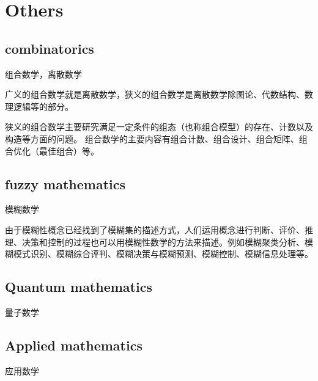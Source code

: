 

\chapter{Others}



\section{combinatorics}
组合数学，离散数学

广义的组合数学就是离散数学，狭义的组合数学是离散数学除图论、代数结构、数理逻辑等的部分。

狭义的组合数学主要研究满足一定条件的组态（也称组合模型）的存在、计数以及构造等方面的问题。 组合数学的主要内容有组合计数、组合设计、组合矩阵、组合优化（最佳组合）等。

\section{fuzzy mathematics}
模糊数学

由于模糊性概念已经找到了模糊集的描述方式，人们运用概念进行判断、评价、推理、决策和控制的过程也可以用模糊性数学的方法来描述。例如模糊聚类分析、模糊模式识别、模糊综合评判、模糊决策与模糊预测、模糊控制、模糊信息处理等。

\section{Quantum mathematics}

量子数学


\section{Applied mathematics}
应用数学

